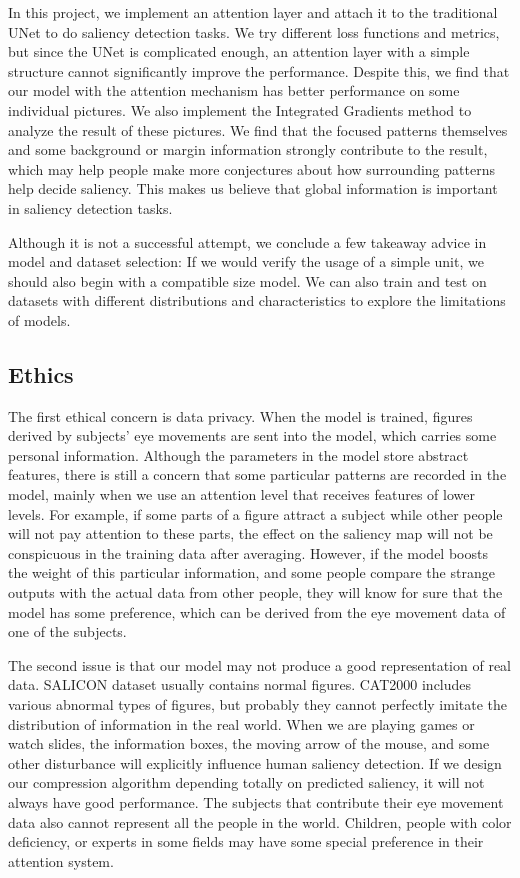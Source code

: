 \documentclass[12pt]{article}
\begin{document}
In this project, we implement an attention layer and attach it to the traditional UNet to do saliency detection tasks.
We try different loss functions and metrics, but since the UNet is complicated enough, an attention layer with a simple structure cannot significantly improve the performance.
Despite this, we find that our model with the attention mechanism has better performance on some individual pictures.
We also implement the Integrated Gradients method to analyze the result of these pictures.
We find that the focused patterns themselves and some background or margin information strongly contribute to the result, which may help people make more conjectures about how surrounding patterns help decide saliency.
This makes us believe that global information is important in saliency detection tasks.



Although it is not a successful attempt, we conclude a few takeaway advice in model and dataset selection:
If we would verify the usage of a simple unit, we should also begin with a compatible size model.
We can also train and test on datasets with different distributions and characteristics to explore the limitations of models.

\subsection{Ethics}
The first ethical concern is data privacy. 
When the model is trained, figures derived by subjects’ eye movements are sent into the model, 
which carries some personal information. 
Although the parameters in the model store abstract features, 
there is still a concern that some particular patterns are recorded in the model,
mainly when we use an attention level that receives features of lower levels.
For example, if some parts of a figure attract a subject while other people will not pay attention to these parts,
the effect on the saliency map will not be conspicuous in the training data after averaging.
However, if the model boosts the weight of this particular information,
and some people compare the strange outputs with the actual data from other people,
they will know for sure that the model has some preference,
which can be derived from the eye movement data of one of the subjects.

The second issue is that our model may not produce a good representation of real data. 
SALICON dataset usually contains normal figures.
CAT2000 includes various abnormal types of figures, but probably they cannot perfectly imitate the distribution of information in the real world.
When we are playing games or watch slides, the information boxes,
the moving arrow of the mouse, and some other disturbance will explicitly influence human saliency detection.
If we design our compression algorithm depending totally on predicted saliency,
it will not always have good performance.
The subjects that contribute their eye movement data also cannot represent all the people in the world.
Children, people with color deficiency, or experts in some fields may have some special preference in their attention system.
\end{document}
